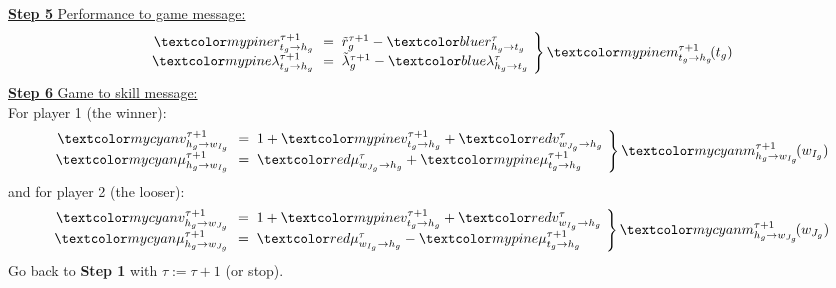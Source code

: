 \begin{frame}
\underline{{\bf Step 5} Performance to game message:}
\[
\left.\begin{array}{rl}
\Green{r^{\tau+1}_{t_g\rightarrow h_g}}\!\!&=\;\tilde r^{\tau+1}_g -
\Blue{r^\tau_{h_g\rightarrow t_g}}\\
\Green{\lambda^{\tau+1}_{t_g\rightarrow h_g}}\!\!&=\;\tilde\lambda^{\tau+1}_g-
\Blue{\lambda^\tau_{h_g\rightarrow t_g}}
\end{array}\!\right\} \Green{m^{\tau+1}_{t_g\rightarrow h_g}\!(t_g)}
\]
\underline{{\bf Step 6} Game to skill message:}\\
For player 1 (the winner):
\[
\left.\begin{array}{rl}
\Cyan{v^{\tau+1}_{h_g\rightarrow w_{I_g}}}\!\!&=\;1+\Green{v^{\tau+1}_{t_g\rightarrow h_g}}+\Red{v^\tau_{w_{J_g}\rightarrow h_g}}\\
\Cyan{\mu^{\tau+1}_{h_g\rightarrow
 w_{I_g}}}\!\!&=\;\Red{\mu^\tau_{w_{J_g}\rightarrow h_g}}+\Green{\mu^{\tau+1}_{t_g\rightarrow h_g}}
\end{array}\!\right\} \Cyan{m^{\tau+1}_{h_g\rightarrow w_{I_g}}\!(w_{I_g})}
\]
and for player 2 (the looser):
\[
\left.\begin{array}{rl}
\Cyan{v^{\tau+1}_{h_g\rightarrow
  w_{J_g}}}\!\!&=\;1+\Green{v^{\tau+1}_{t_g\rightarrow h_g}}+\Red{v^\tau_{w_{I_g}\rightarrow h_g}}\\
\Cyan{\mu^{\tau+1}_{h_g\rightarrow
 w_{J_g}}}\!\!&=\;\Red{\mu^\tau_{w_{I_g}\rightarrow h_g}}-\Green{\mu^{\tau+1}_{t_g\rightarrow h_g}}
\end{array}\!\right\} \Cyan{m^{\tau+1}_{h_g\rightarrow w_{J_g}}\!(w_{J_g})}
\]
Go back to {\bf Step 1} with $\tau:=\tau+1$ (or stop).
\end{frame}


